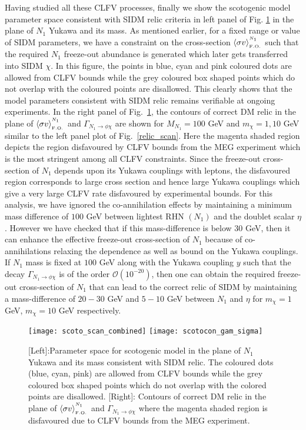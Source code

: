 \documentclass[prd,nofootinbib,preprint,superscriptaddress]{revtex4}
\begin{document}
Having studied all these CLFV processes, finally we show the scotogenic model parameter space consistent with SIDM relic criteria in left panel of Fig. \ref{scotops}  in the plane of $N_1$ Yukawa and its mass. As mentioned earlier, for a fixed range or value of SIDM parameters, we have a constraint on the cross-section $\langle\sigma v \rangle^{^{N_1}}_{_{ \rm F.O.}}$ such that the required $N_1$ freeze-out abundance is generated which later gets transferred into SIDM $\chi$.
In this figure, the points in blue, cyan and pink coloured dots are allowed from CLFV bounds while the grey coloured box shaped points which do not overlap with the coloured points are disallowed. This clearly shows that the model parameters consistent with SIDM relic remains verifiable at ongoing experiments. In the right panel of Fig.~\ref{scotops}, the contours of correct DM relic in the plane of $\langle\sigma v \rangle^{^{N_1}}_{_{ \rm F.O.}}$ and $\Gamma_{N_1 \to \phi \chi}$ are shown for $M_{N_1}=100$ GeV and $m_{\chi}=1,10$ GeV similar to the left panel plot of Fig.~\ref{relic_scan}. Here the magenta shaded region depicts the region disfavoured by CLFV bounds from the MEG experiment \cite{TheMEG:2016wtm} which is the most stringent among all CLFV constraints. Since the freeze-out cross-section of $N_1$ depends upon its Yukawa couplings with leptons, the disfavoured region corresponds to large cross section and hence large Yukawa couplings which give a very large CLFV rate disfavoured by experimental bounds. For this analysis, we have ignored the co-annihilation effects by maintaining a minimum mass difference of $100$ GeV between lightest RHN $(N_1)$ and the doublet scalar $\eta$. However we have checked that if this mass-difference is below $30$ GeV, then it can enhance the effective freeze-out cross-section of $N_1$ because of co-annihilations relaxing the dependence as well as bound on the Yukawa couplings. If $N_1$ mass is fixed at $100$ GeV along with the Yukawa coupling $y$ such that the decay $\Gamma_{N_{1} \to \phi \chi}$ is of the order $\mathcal{O}(10^{-20})$, then one can obtain the required freeze-out cross-section of $N_1$ that can lead to the correct relic of SIDM by maintaining a mass-difference of $20-30$ GeV and $5-10$ GeV between $N_1$ and $\eta$ for $m_\chi=1$ GeV, $m_{\chi}=10$ GeV respectively.    


\begin{figure}[h!]
\centering
\texttt{[image: scoto\_scan\_combined]}
\hfil
\texttt{[image: scotocon\_gam\_sigma]}
\caption{[Left]:Parameter space for scotogenic model in the plane of $N_1$ Yukawa and its mass consistent with SIDM relic. The coloured dots (blue, cyan, pink) are allowed from CLFV bounds while the grey coloured box shaped points which do not overlap with the colored points are disallowed.
	[Right]: Contours of correct DM relic in the plane of $\langle\sigma v \rangle^{^{N_1}}_{_{ \rm F.O.}}$ and $\Gamma_{N_1 \to \phi \chi}$ where the magenta shaded region is disfavoured due to CLFV bounds from the MEG experiment. }
\label{scotops}
\end{figure}
\end{document}
